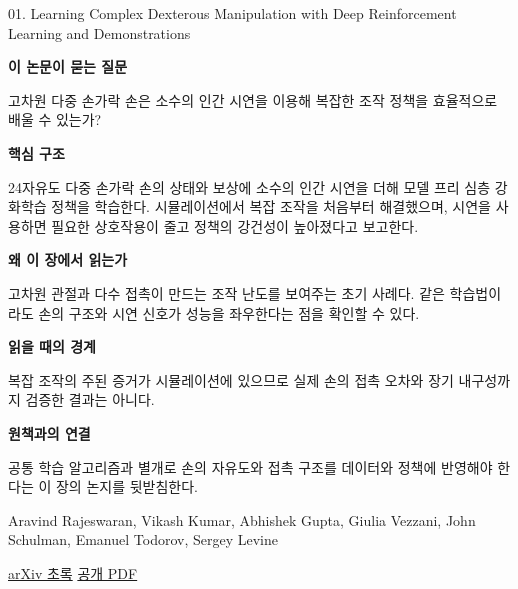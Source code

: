 \documentclass[11pt,openany]{book}
\begin{document}
\begin{termcard}{01. Learning Complex Dexterous Manipulation with Deep Reinforcement Learning and Demonstrations}

\par

\medskip

{\sffamily\bfseries\color{deepblue} 이 논문이 묻는 질문}\par

고차원 다중 손가락 손은 소수의 인간 시연을 이용해 복잡한 조작 정책을 효율적으로 배울 수 있는가?

\smallskip

{\sffamily\bfseries\color{deepblue} 핵심 구조}\par

24자유도 다중 손가락 손의 상태와 보상에 소수의 인간 시연을 더해 모델 프리 심층 강화학습 정책을 학습한다. 시뮬레이션에서 복잡 조작을 처음부터 해결했으며, 시연을 사용하면 필요한 상호작용이 줄고 정책의 강건성이 높아졌다고 보고한다.

\smallskip

{\sffamily\bfseries\color{deepblue} 왜 이 장에서 읽는가}\par

고차원 관절과 다수 접촉이 만드는 조작 난도를 보여주는 초기 사례다. 같은 학습법이라도 손의 구조와 시연 신호가 성능을 좌우한다는 점을 확인할 수 있다.

\smallskip

{\sffamily\bfseries\color{coral} 읽을 때의 경계}\par

복잡 조작의 주된 증거가 시뮬레이션에 있으므로 실제 손의 접촉 오차와 장기 내구성까지 검증한 결과는 아니다.

\smallskip

{\sffamily\bfseries\color{teal} 원책과의 연결}\par

공통 학습 알고리즘과 별개로 손의 자유도와 접촉 구조를 데이터와 정책에 반영해야 한다는 이 장의 논지를 뒷받침한다.

\medskip

{\footnotesize\color{muted} Aravind Rajeswaran, Vikash Kumar, Abhishek Gupta, Giulia Vezzani, John Schulman, Emanuel Todorov, Sergey Levine\par

\href{https://arxiv.org/abs/1709.10087}{arXiv 초록} \quad \href{https://arxiv.org/pdf/1709.10087}{공개 PDF}\par}

\end{termcard}
\end{document}
